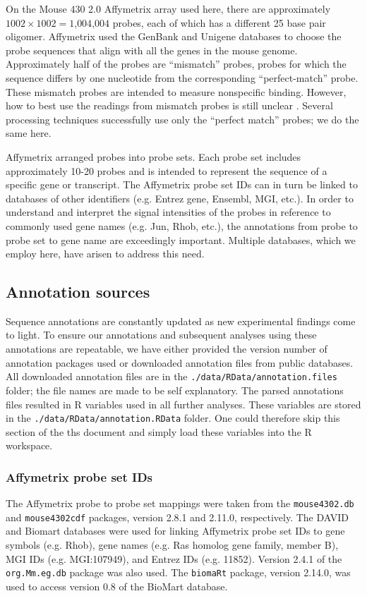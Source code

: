 On the Mouse 430 2.0 Affymetrix array used here, there are 
approximately $1002 \times 1002=1$,$004$,$004$ 
probes, each of which has a different 25 base pair oligomer. Affymetrix
used the GenBank and Unigene databases to choose the 
probe sequences that align with all the genes in the 
mouse genome. Approximately half of the probes are ``mismatch'' probes, probes for
which the sequence differs by one nucleotide from the corresponding ``perfect-match'' probe. 
These mismatch probes are intended to measure nonspecific binding. However,
how to best use the readings from mismatch probes is 
still unclear \cite{Wang:2007dy}.
Several processing techniques successfully use only the ``perfect match''
probes; we do the same here.

Affymetrix arranged probes into probe sets. Each probe set includes
approximately 10-20 probes and is intended to represent the sequence
of a specific gene or transcript. The Affymetrix probe set
IDs can in turn be linked to databases of other identifiers
(e\@.g\@. Entrez gene, Ensembl, MGI, etc\@.). In order to 
understand and interpret the signal intensities of the probes
in reference to commonly used gene names (e\@.g\@. Jun, Rhob, 
etc\@.), the annotations from probe to probe set to gene name
are exceedingly important. Multiple databases, which we employ here,
have arisen to address this need.

\subsection{Annotation sources}
Sequence annotations are constantly updated as new experimental
findings come to light. To ensure our annotations and subsequent
analyses using these annotations are repeatable, 
we have either provided the
version number of annotation packages used or downloaded annotation files
from public databases. All downloaded annotation files are in the
\texttt{./data/RData/annotation.files} folder;
the file names are made to be self explanatory. The
parsed annotations files resulted in R variables used in all further analyses. These
variables are stored in the \texttt{./data/RData/annotation.RData} folder.
One could therefore skip this section of the ths document and simply load
these variables into the R workspace.

\subsubsection{Affymetrix probe set IDs}
The Affymetrix
probe to probe set mappings were taken from the 
\texttt{mouse4302.db} and \texttt{mouse4302cdf} packages, 
version 2\@.8\@.1 and 2\@.11\@.0, respectively. 
The DAVID \cite{Huang:2009uz} and 
Biomart \cite{Kasprzyk:2011ky}
databases were used for linking
Affymetrix probe set IDs to gene symbols (e\@.g\@. Rhob), 
gene names (e\@.g\@. Ras homolog gene family, member B),
MGI IDs (e\@.g\@. MGI:107949), and Entrez IDs (e\@.g\@. 11852).
Version 2\@.4\@.1 of the \texttt{org.Mm.eg.db} package was also used.
The \texttt{biomaRt} package, version 2\@.14\@.0, was used
to access version 0\@.8 of the BioMart database.

